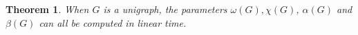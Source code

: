 \documentclass[11pt]{article}
\newtheorem{theorem}[df]{Theorem}
\newtheorem{corollary}[df]{Corollary}
\begin{document}






\begin{theorem}
When $G$ is a unigraph, the parameters $\omega(G), \chi(G)$, $\alpha(G)$ and $\beta(G)$ can all be computed in linear time.  
\end{theorem}
\end{document}
